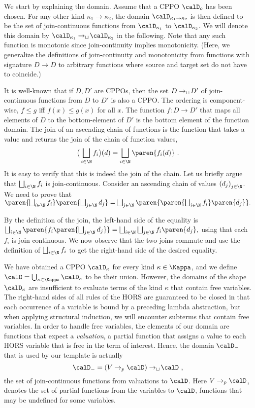 \documentclass[../../diss.tex]{subfiles}
\begin{document}
We start by explaining the domain.
Assume that a CPPO $\domain{\ground}$ has been chosen.
For any other kind $\kappa_1 \to \kappa_2$, the domain $\domain{\kappa_1 \to \kappa_2}$ is then defined to be the set of join-continuous functions from $\domain{\kappa_1}$ to $\domain{\kappa_2}$.
We will denote this domain by $\domain{\kappa_1} \cto \domain{\kappa_2}$ in the following.
Note that any such function is monotonic since join-continuity implies monotonicity.
(Here, we generalize the definitions of join-continuity and monotonicity from functions with signature $D \to D$ to arbitrary functions where source and target set do not have to coincide.)

It is well-known that if $D,D'$ are CPPOs, then the set $D \to_{\sqcup}\! D'$ of join-continuous functions from $D$ to $D'$ is also a CPPO.\@
The ordering is component-wise, \ie $f \leq g$ iff $f(x) \leq g(x)$ for all $x$.
The function $f \colon D \to D'$ that maps all elements of $D$ to the bottom-element of $D'$ is the bottom element of the function domain.
The join of an ascending chain of functions is the function that takes a value and returns the join of the chain of function values,
\[
    \big(\bigsqcup_{i \in \N} f_i \big) (d) = \bigsqcup_{i \in \N} \paren{ f_i(d) }
    \ .
\]
It is easy to verify that this is indeed the join of the chain.
Let us briefly argue that $\bigsqcup_{i \in \N} f_i$ is join-continuous.
Consider an ascending chain of values ${(d_j)}_{j \in \N}$.
We need to prove that
\(
    \paren{ \bigsqcup_{i \in \N} f_i } \paren{\bigsqcup_{j \in \N} d_j}
    =
    \bigsqcup_{j \in \N} \paren{ \paren{ \bigsqcup_{i \in \N} f_i } \paren{d_j}}
    .
\)

By the definition of the join, the left-hand side of the equality is
\(
    \bigsqcup_{i \in \N} \paren{ f_i \paren{ \bigsqcup_{j \in \N} d_j} }
    =
    \bigsqcup_{i \in \N} \bigsqcup_{j \in \N} f_i \paren{d_j}
    ,
\)
using that each $f_i$ is join-continuous.
We now observe that the two joins commute and use the definition of $\bigsqcup_{i \in \N} f_i$ to get the right-hand side of the desired equality.

We have obtained a CPPO $\domain{\kappa}$ for every kind $\kappa \in \kinds$, and we define \( \domain = \bigcup_{\kappa \in \kinds } \domain{\kappa} \) to be their union.
However, the domains of the shape $\domain{\kappa}$ are insufficient to evaluate terms of the kind $\kappa$ that contain free variables.
The right-hand sides of all rules of the HORS are guaranteed to be closed in that each occurrence of a variable is bound by a preceding lambda abstraction, but when applying structural induction, we will encounter subterms that contain free variables.
In order to handle free variables, the elements of our domain are functions that expect a \emph{valuation}, a partial function that assigns a value to each HORS variable that is free in the term of interest.
Hence, the domain $\domaint$ that is used by our template is actually
\[
    \domaint = (V \pto \domain) \cto \domain
    \ ,
\]
the set of join-continuous functions from valuations to $\domain$.
Here $V \pto \domain$, denotes the set of partial functions from the variables to $\domain$, functions that may be undefined for some variables.
\end{document}
